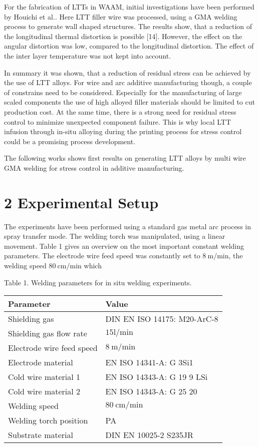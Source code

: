 \documentclass[10pt]{article}
\begin{document}
For the fabrication of LTTs in WAAM, initial investigations have been performed by Houichi et al.. Here LTT filler wire was processed, using a GMA welding process to generate wall shaped structures. The results show, that a reduction of the longitudinal thermal distortion is possible [14]. However, the effect on the angular distortion was low, compared to the longitudinal distortion. The effect of the inter layer temperature was not kept into account.

In summary it was shown, that a reduction of residual stress can be achieved by the use of LTT alloys. For wire and arc additive manufacturing though, a couple of constrains need to be considered. Especially for the manufacturing of large scaled components the use of high alloyed filler materials should be limited to cut production cost. At the same time, there is a strong need for residual stress control to minimize unexpected component failure. This is why local LTT infusion through in-situ alloying during the printing process for stress control could be a promising process development.

The following works shows first results on generating LTT alloys by multi wire GMA welding for stress control in additive manufacturing.

\section*{2 Experimental Setup}
The experiments have been performed using a standard gas metal arc process in spray transfer mode. The welding torch was manipulated, using a linear movement. Table 1 gives an overview on the most important constant welding parameters. The electrode wire feed speed was constantly set to $8 \mathrm{~m} / \mathrm{min}$, the welding speed $80 \mathrm{~cm} / \mathrm{min}$ which

Table 1. Welding parameters for in situ welding experiments.

\begin{center}
\begin{tabular}{l|l}
\hline
Parameter & Value \\
\hline
Shielding gas & DIN EN ISO 14175: M20-ArC-8 \\
\hline
Shielding gas flow rate & $15 \mathrm{l} / \mathrm{min}$ \\
\hline
Electrode wire feed speed & $8 \mathrm{~m} / \mathrm{min}$ \\
\hline
Electrode material & EN ISO 14341-A: G 3Si1 \\
\hline
Cold wire material 1 & EN ISO 14343-A: G 19 9 LSi \\
\hline
Cold wire material 2 & EN ISO 14343-A: G 25 20 \\
\hline
Welding speed & $80 \mathrm{~cm} / \mathrm{min}$ \\
\hline
Welding torch position & PA \\
\hline
Substrate material & DIN EN 10025-2 S235JR \\
\hline
\end{tabular}
\end{center}
\end{document}
